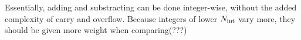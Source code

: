 \documentclass[./thesis.tex]{subfiles}
\begin{document}
Essentially, adding and substracting can be done integer-wise, without the added complexity of carry and overflow.
Because integers of lower ${N_\text{int}}$ vary more, they should be given more weight when comparing(???)



\begin{algorithm}
	
\end{algorithm}
\end{document}
